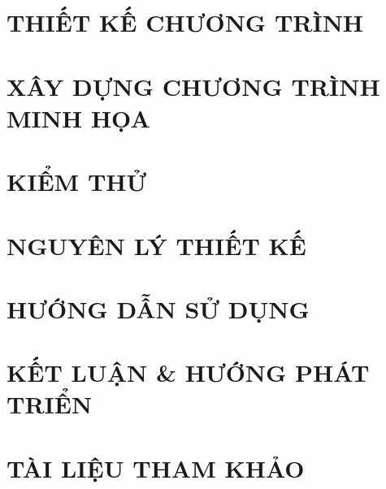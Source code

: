 \documentclass[a4paper,13pt,3p,oneside]{report}
\theoremstyle{definition}
\begin{document}
\clearpage
\chapter{THIẾT KẾ CHƯƠNG TRÌNH}
\label{chapter:4}


\clearpage
\chapter{XÂY DỰNG CHƯƠNG TRÌNH MINH HỌA}
\label{chapter:5}


\clearpage
\chapter{KIỂM THỬ}
\label{chapter:6}


\clearpage
\chapter{NGUYÊN LÝ THIẾT KẾ}
\label{chapter:7}


\clearpage
\chapter{HƯỚNG DẪN SỬ DỤNG}
\label{chapter:8}


\clearpage
\chapter*{KẾT LUẬN \& HƯỚNG PHÁT TRIỂN}
\label{chapter:Ket_luan}


\clearpage
\chapter*{TÀI LIỆU THAM KHẢO}
\label{chapter:Tai_lieu_tham_khao}

\end{document}
